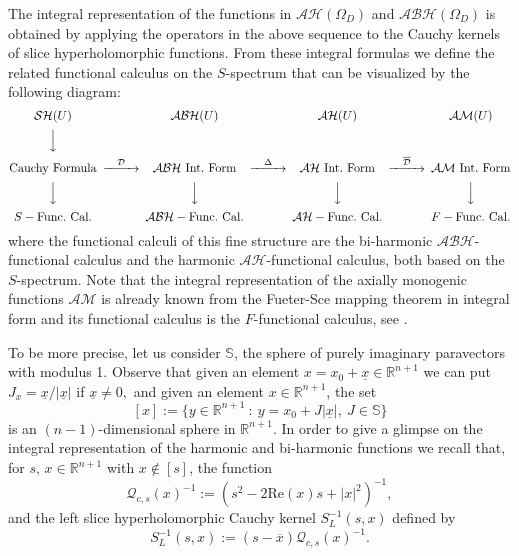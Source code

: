 \documentclass[reqno,11pt]{amsart}
\numberwithin{equation}{section}
\newcommand{\PRes}{\mathcal{Q}}
\theoremstyle{definition}
\newcommand{\rr}{\mathbb{R}}
\renewcommand{\Re}{\mathrm{Re}}
\begin{document}
The integral  representation of the functions in $\mathcal{AH}(\Omega_D)$ and $\mathcal{ABH}(\Omega_D)$ is obtained
by applying the operators in the above sequence to the
Cauchy kernels of slice hyperholomorphic functions.
 From these integral formulas
  we define the related functional calculus on the $S$-spectrum that can be visualized by the following diagram:
\begin{equation*}
\begin{CD}
{\mathcal{SH}(U)}  @. \mathcal{ABH}(U)  @. \mathcal{AH}(U)  @.{\mathcal{AM}(U)} \\   @V  VV
  @.
\\
{{\rm  Cauchy\ Formula}}  @> \mathcal{D}>> {{\rm \mathcal{ABH}\ \mathrm{Int.\ Form}}} @> \Delta>> {{\rm
\mathcal{AH}\ \mathrm{Int.\ Form}}}@> \overline{\mathcal{D}}>> {{\rm \mathcal{AM}\ \mathrm{Int.\ Form}  }}
\\
@V VV    @V VV  @V VV    @V VV
\\
{S-{\rm  \mathrm{Func.\ Cal.} }} @. {{\rm \mathcal{ABH}-\mathrm{Func.\ Cal.} }}@. {{\rm \mathcal{AH} -\mathrm{Func.\ Cal.}}}@. {F-{\rm \mathrm{Func.\ Cal.}}}
\end{CD}
\end{equation*}
where the functional calculi of this fine structure are the
 bi-harmonic $\mathcal{ABH}$-functional calculus and the harmonic $\mathcal{AH}$-functional calculus,
both based on the $S$-spectrum.
Note that the integral representation of the axially monogenic functions
$\mathcal{AM}$ is already known from the Fueter-Sce mapping theorem
in integral form and its functional calculus is the $F$-functional calculus, see \cite{CSS10}.

\medskip
To be more precise, let us consider
 $\mathbb{S}$, the sphere of purely imaginary paravectors with modulus 1.
Observe that given an element $x=x_0+\underline{x}\in\rr^{n+1}$ we can put
$
J_x=\underline{x}/|\underline{x}|$ if $\underline{x}\not=0,
$
 and given an element $x\in\rr^{n+1}$, the set
$$
[x]:=\{y\in\rr^{n+1}\ :\ y=x_0+J |\underline{x}|, \ J\in \mathbb{S}\}
$$
is an $(n-1)$-dimensional sphere in $\mathbb{R}^{n+1}$.
In order to give a glimpse  on the integral representation of the harmonic and bi-harmonic functions
we recall that, for $s,\, x\in \mathbb R^{n+1}$ with $x\notin [s]$, the function
	$$
	\PRes_{c,s}(x)^{-1}:=(s^2-2\Re(x)s+|x|^2)^{-1},
	$$
	and the  left slice hyperholomorphic Cauchy kernel  $S^{-1}_L(s,x)$ defined by
		$$S^{-1}_L(s,x):=(s-\overline x) \PRes_{c,s}(x)^{-1}.$$
\end{document}
